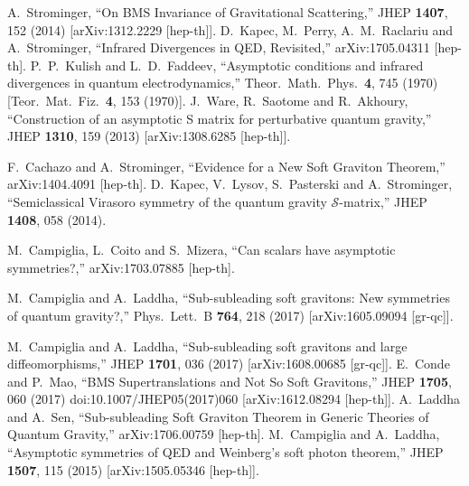 \documentclass[12pt]{article}
\numberwithin{equation}{section}
\begin{document}
\begin{thebibliography}{99}
  A.~Strominger,
  ``On BMS Invariance of Gravitational Scattering,''
  JHEP {\bf 1407}, 152 (2014)
[arXiv:1312.2229 [hep-th]].
  D.~Kapec, M.~Perry, A.~M.~Raclariu and A.~Strominger,
  ``Infrared Divergences in QED, Revisited,''
  arXiv:1705.04311 [hep-th].
  P.~P.~Kulish and L.~D.~Faddeev,
 ``Asymptotic conditions and infrared divergences in quantum electrodynamics,''
  Theor.\ Math.\ Phys.\  {\bf 4}, 745 (1970)
  [Teor.\ Mat.\ Fiz.\  {\bf 4}, 153 (1970)].
  J.~Ware, R.~Saotome and R.~Akhoury,
  ``Construction of an asymptotic S matrix for perturbative quantum gravity,''
  JHEP {\bf 1310}, 159 (2013)
  [arXiv:1308.6285 [hep-th]].
 
  F.~Cachazo and A.~Strominger,
``Evidence for a New Soft Graviton Theorem,''
  arXiv:1404.4091 [hep-th].
  D.~Kapec, V.~Lysov, S.~Pasterski and A.~Strominger,
  ``Semiclassical Virasoro symmetry of the quantum gravity $ \mathcal{S}$-matrix,''
  JHEP {\bf 1408}, 058 (2014).


  M.~Campiglia, L.~Coito and S.~Mizera,
``Can scalars have asymptotic symmetries?,''
  arXiv:1703.07885 [hep-th].

  M.~Campiglia and A.~Laddha,
  ``Sub-subleading soft gravitons: New symmetries of quantum gravity?,''
  Phys.\ Lett.\ B {\bf 764}, 218 (2017)
  [arXiv:1605.09094 [gr-qc]].
  
  M.~Campiglia and A.~Laddha,
  ``Sub-subleading soft gravitons and large diffeomorphisms,''
  JHEP {\bf 1701}, 036 (2017)
  [arXiv:1608.00685 [gr-qc]].
  E.~Conde and P.~Mao,
``BMS Supertranslations and Not So Soft Gravitons,''
  JHEP {\bf 1705}, 060 (2017)
  doi:10.1007/JHEP05(2017)060
  [arXiv:1612.08294 [hep-th]].
  A.~Laddha and A.~Sen,
  ``Sub-subleading Soft Graviton Theorem in Generic Theories of Quantum Gravity,''
  arXiv:1706.00759 [hep-th].
  M.~Campiglia and A.~Laddha,
  ``Asymptotic symmetries of QED and Weinberg's soft photon theorem,''
  JHEP {\bf 1507}, 115 (2015)
  [arXiv:1505.05346 [hep-th]].
\end{thebibliography}
\end{document}

